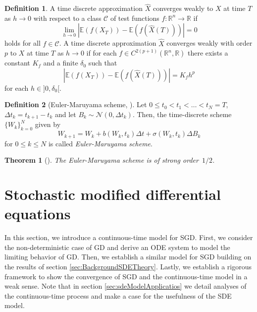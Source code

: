 \documentclass[12pt]{article}
\newtheorem{theorem}{Theorem}[section]
\theoremstyle{definition}
\newtheorem{definition}[definition]{Definition}
\numberwithin{equation}{section}
\newcommand{\CN}{\mathcal{N}}
\begin{document}
\begin{definition}
  A time discrete approximation $\widehat{X}$ converges weakly to $X$ at time $T$ as $h \rightarrow 0$ with respect to a class $\mathcal{C}$ of test functions $f: \mathbb{R}^n \rightarrow \mathbb{R}$ if 
  \begin{equation}
    \lim_{h \rightarrow 0} |\mathbb{E}(f(X_T)) - \mathbb{E}(f(\widehat{X}(T)))| = 0
  \end{equation}
  holds for all $f \in \mathcal{C}$.
  A time discrete approximation $\widehat{X}$ converges weakly with order $p$ to $X$ at time $T$ as $h \rightarrow 0$ if for each $f \in C^{2(p+1)}(\mathbb{R}^n, \mathbb{R})$ there exists a constant $K_f$ and a finite $\delta_0$ such that 
  \begin{equation}
     |\mathbb{E}(f(X_T)) - \mathbb{E}(f(\widehat{X}(T)))| = K_f h^p
  \end{equation}
  for each $h \in ]0, \delta_0[$.
\end{definition}
\begin{definition}[Euler-Maruyama scheme, ]
  Let $0 \leq t_0 < t_1 < \dots < t_N = T$, $\Delta t_k = t_{k+1} - t_k$ and let $B_k \sim \CN(0,\Delta t_k)$. Then, the time-discrete scheme $\{W_k\}_{k=0}^N$ given by
\begin{equation}
  \label{eq:euler_maruyama}
  W_{k+1} = W_k + b(W_k, t_k)\Delta t + \sigma(W_k, t_k) \Delta B_k
\end{equation}
for $0 \leq k \leq N$ is called \emph{Euler-Maruyama scheme}.
\end{definition}

\begin{theorem}[]
  The Euler-Maruyama scheme is of strong order~$1/2$.
\end{theorem}
\section{Stochastic modified differential equations}
\label{sec:sde_model}
In this section, we introduce a continuous-time model for SGD. First, we consider the non-deterministic case of GD and derive an ODE system to model the limiting behavior of GD. Then, we establish a similar model for SGD building on the results of section \autoref{sec:BackgroundSDETheory}. Lastly, we establish a rigorous framework to show the convergence of SGD and the continuous-time model in a weak sense.
Note that in section \autoref{sec:sdeModelApplicatios} we detail analyses of the continuous-time process and make a case for the usefulness of the SDE model.
\end{document}
